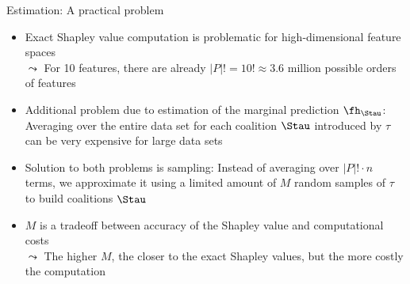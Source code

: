 \documentclass[11pt,compress,t,notes=noshow, aspectratio=169, xcolor=table]{beamer}
\begin{document}
\begin{frame}{Estimation: A practical problem}
  \begin{itemize}[<+->]
      \item Exact Shapley value computation is problematic for high-dimensional feature spaces\\
      $\leadsto$ For 10 features, there are already $|P|! = 10! \approx 3.6$ million possible orders of features
      \item Additional problem due to estimation of the marginal prediction $\fh_{\Stau}$: Averaging over the entire data set for each coalition $\Stau$ introduced by $\tau$ can be very expensive for large data sets
      \item Solution to both problems is sampling:
      Instead of averaging over $|P|! \cdot n$ terms, we approximate it using a limited amount of $M$ random samples of $\tau$ to build coalitions $\Stau$
      \item $M$ is a tradeoff between accuracy of the Shapley value and computational costs\\
      $\leadsto$ The higher $M$, the closer to the exact Shapley values, but the more costly the computation
  \end{itemize}
\end{frame}

\newcommand{\xk}{\mathbf{x}^{(k)}}
\end{document}
